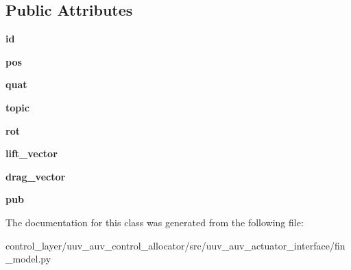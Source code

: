 \subsection*{Public Attributes}
\begin{DoxyCompactItemize}
\item 
\mbox{\label{classuuv__auv__actuator__interface_1_1fin__model_1_1FinModel_adb2d671adfee20ff82cb43c1a696384c}} 
{\bfseries id}
\item 
\mbox{\label{classuuv__auv__actuator__interface_1_1fin__model_1_1FinModel_aa1b8c3a221069fb8d9c2485d2685c07c}} 
{\bfseries pos}
\item 
\mbox{\label{classuuv__auv__actuator__interface_1_1fin__model_1_1FinModel_ab8d1a9dd20e3f1a0468b902e9facaf89}} 
{\bfseries quat}
\item 
\mbox{\label{classuuv__auv__actuator__interface_1_1fin__model_1_1FinModel_a182765f56abc7234d74c0406712bef0b}} 
{\bfseries topic}
\item 
\mbox{\label{classuuv__auv__actuator__interface_1_1fin__model_1_1FinModel_a8b81e3ce36f9718d10fad74518fbc066}} 
{\bfseries rot}
\item 
\mbox{\label{classuuv__auv__actuator__interface_1_1fin__model_1_1FinModel_a496c22a608b6b8405366f276130f57d9}} 
{\bfseries lift\+\_\+vector}
\item 
\mbox{\label{classuuv__auv__actuator__interface_1_1fin__model_1_1FinModel_a7de2f1459a2f8ca5b12d24f414508150}} 
{\bfseries drag\+\_\+vector}
\item 
\mbox{\label{classuuv__auv__actuator__interface_1_1fin__model_1_1FinModel_aace8499fc4475f553f393b1217d2eb4a}} 
{\bfseries pub}
\end{DoxyCompactItemize}


The documentation for this class was generated from the following file\+:\begin{DoxyCompactItemize}
\item 
control\+\_\+layer/uuv\+\_\+auv\+\_\+control\+\_\+allocator/src/uuv\+\_\+auv\+\_\+actuator\+\_\+interface/fin\+\_\+model.\+py\end{DoxyCompactItemize}
